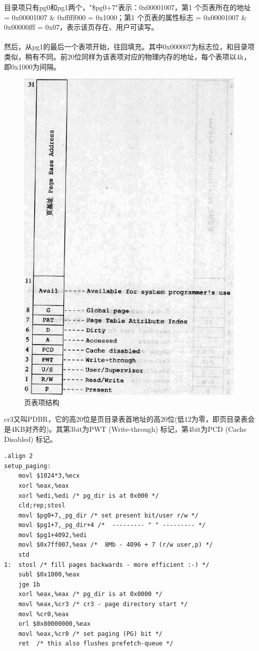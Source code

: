 \documentclass[12pt]{article}
\begin{document}
目录项只有pg0和pg1两个，"\$pg0+7"表示：0x00001007，第1 个页表所在的地址 = 0x00001007 \& 0xfffff000 = 0x1000；第1 个页表的属性标志 = 0x00001007 \& 0x00000fff = 0x07，表示该页存在、用户可读写。\\\\
然后，从pg1的最后一个表项开始，往回填充。其中0x000007为标志位，和目录项类似，稍有不同。前20位同样为该表项对应的物理内存的地址，每个表项以4k，即0x1000为间隔。
\begin{figure}[htbp]
\centering
\includegraphics[scale=0.5]{fig/11.png}
\caption{页表项结构}
\label{fig:PTE}
\end{figure}
cr3又叫PDBR，它的高20位是页目录表首地址的高20位(低12为零，即页目录表会是4KB对齐的)。其第3bit为PWT (Write-through) 标记，第4bit为PCD (Cache Disabled) 标记。
\begin{lstlisting}[breaklines]
.align 2
setup_paging:
	movl $1024*3,%ecx
	xorl %eax,%eax
	xorl %edi,%edi /* pg_dir is at 0x000 */
	cld;rep;stosl
	movl $pg0+7,_pg_dir /* set present bit/user r/w */
	movl $pg1+7,_pg_dir+4 /*  --------- " " --------- */
	movl $pg1+4092,%edi
	movl $0x7ff007,%eax /*  8Mb - 4096 + 7 (r/w user,p) */
	std
1:	stosl /* fill pages backwards - more efficient :-) */
	subl $0x1000,%eax
	jge 1b
	xorl %eax,%eax /* pg_dir is at 0x0000 */
	movl %eax,%cr3 /* cr3 - page directory start */
	movl %cr0,%eax
	orl $0x80000000,%eax
	movl %eax,%cr0 /* set paging (PG) bit */
	ret	 /* this also flushes prefetch-queue */	
\end{lstlisting}
\end{document}
